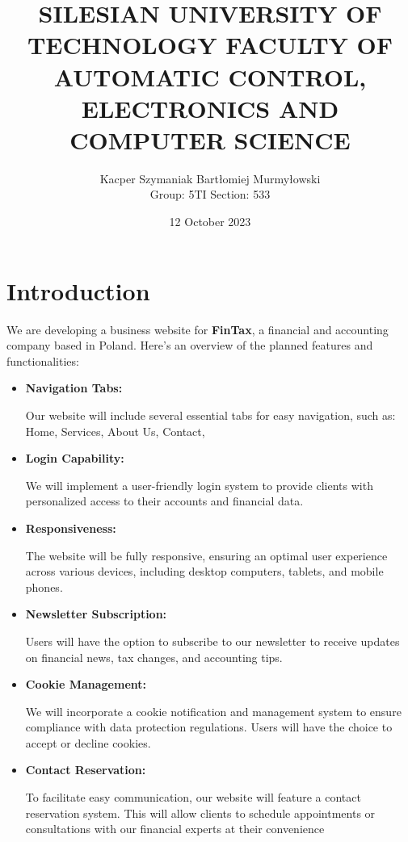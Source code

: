 \documentclass{article}
\title{\textbf{SILESIAN UNIVERSITY OF TECHNOLOGY FACULTY OF AUTOMATIC CONTROL, ELECTRONICS AND COMPUTER SCIENCE}}
\author{Kacper Szymaniak Bartłomiej Murmyłowski \\
Group: 5TI Section: 533
}
\date{12 October 2023}
\begin{document}
\thispagestyle{empty}
    \maketitle
 \restoregeometry
    \newpage
{}   
\fontsize{14}{16}\selectfont

\tableofcontents

    
    \newpage
    \section{Introduction}
We are developing a business website for \textbf{FinTax}, a financial and accounting company based in Poland. Here's an overview of the planned features and functionalities:
\begin{itemize}
    \item \textbf{Navigation Tabs:} \par
    Our website will include several essential tabs for easy navigation, such as:
Home, Services, About Us, Contact,

    \item \textbf{Login Capability:}\par
We will implement a user-friendly login system to provide clients with personalized access to their accounts and financial data.
\item \textbf{Responsiveness:} \par
The website will be fully responsive, ensuring an optimal user experience across various devices, including desktop computers, tablets, and mobile phones.

\item \textbf{Newsletter Subscription:} \par

Users will have the option to subscribe to our newsletter to receive updates on financial news, tax changes, and accounting tips.

\item \textbf{Cookie Management:} \par
We will incorporate a cookie notification and management system to ensure compliance with data protection regulations. Users will have the choice to accept or decline cookies.

\item \textbf{Contact Reservation:} \par
To facilitate easy communication, our website will feature a contact reservation system. This will allow clients to schedule appointments or consultations with our financial experts at their convenience

\end{itemize}
\end{document}
